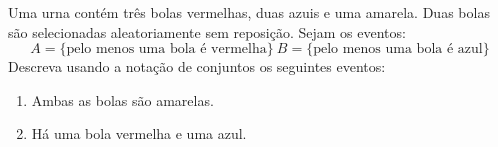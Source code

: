 \item 
Uma urna contém três bolas vermelhas, duas azuis e uma amarela. Duas
bolas são selecionadas aleatoriamente sem reposição. Sejam os eventos:
\[A = \{\mbox{pelo menos uma bola é vermelha}\}\ B = \{\mbox{pelo menos uma bola é azul}\}\]
Descreva usando a notação de conjuntos os seguintes eventos:
\begin{enumerate}
\item Ambas as bolas são amarelas.
\item Há uma bola vermelha e uma azul.
\end{enumerate}